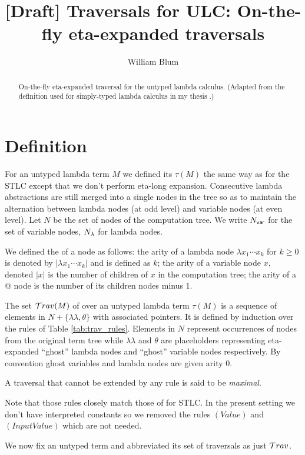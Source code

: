 \documentclass{article}
\author{William Blum}
\title{[Draft] Traversals for ULC: On-the-fly eta-expanded traversals}
\theoremstyle{definition}
\newcommand\Nodes{N}%
\newcommand{\ghostlmd}{{\lambda\!\!\lambda}}
\newcommand{\ghostvar}{\theta}
\begin{document}
\maketitle
\begin{abstract}
On-the-fly eta-expanded traversal for the untyped lambda calculus.
(Adapted from the definition used for simply-typed lambda calculus in my thesis \cite{BlumPhd}.)
\end{abstract}


\section{Definition}

For an untyped lambda term $M$ we defined its  $\tau(M)$ the same way as for the STLC
except that we don't perform eta-long expansion. Consecutive lambda abstractions are still merged into a single nodes in the tree so as to maintain the alternation between lambda nodes (at odd level) and variable nodes (at even level).
Let $\Nodes$ be the set of nodes of the computation tree. We write $\Nodes_{\sf var}$ for the set of variable nodes, $\Nodes_{\sf \lambda}$ for lambda nodes.

We defined the  of a node as follows: the arity of a lambda node $\lambda x_1 \cdots x_k$ for $k\geq 0$ is denoted by $|\lambda x_1 \cdots x_k|$ and is defined as $k$; the arity of a variable node $x$, denoted $|x|$ is the number of children of $x$ in the computation tree; the arity of a $@$ node is the number of its children nodes minus 1.

The set $\mathcal{T}rav(M)$ of  over an untyped lambda term $\tau(M)$ is a sequence of elements in $\Nodes + \{ \ghostlmd, \ghostvar \}$ with associated pointers. It is defined by induction over the rules of Table \ref{tab:trav_rules}.
Elements in $N$ represent occurrences of nodes from the original term tree while $\ghostlmd$ and $\ghostvar$ are placeholders representing eta-expanded ``ghost'' lambda nodes and ``ghost'' variable nodes respectively.
By convention ghost variables and lambda nodes are given arity $0$.

A traversal that cannot be extended by any rule is said to be \emph{maximal}.

Note that those rules closely match those of \cite{BlumPhd} for STLC. In the present setting we don't have interpreted constants so we removed the rules $(Value)$ and $(InputValue)$ which are not needed.

We now fix an untyped term and abbreviated its set of traversals as just $\mathcal{T}rav$.
\end{document}
